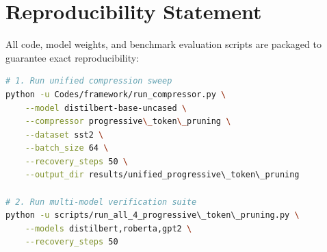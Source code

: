 \section{Reproducibility Statement}
All code, model weights, and benchmark evaluation scripts are packaged to guarantee exact reproducibility:
\begin{lstlisting}[language=bash]
# 1. Run unified compression sweep
python -u Codes/framework/run_compressor.py \
    --model distilbert-base-uncased \
    --compressor progressive\_token\_pruning \
    --dataset sst2 \
    --batch_size 64 \
    --recovery_steps 50 \
    --output_dir results/unified_progressive\_token\_pruning

# 2. Run multi-model verification suite
python -u scripts/run_all_4_progressive\_token\_pruning.py \
    --models distilbert,roberta,gpt2 \
    --recovery_steps 50
\end{lstlisting}

